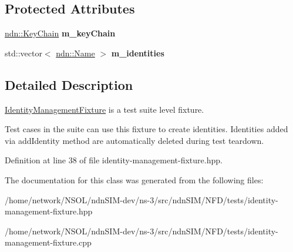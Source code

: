 \subsection*{Protected Attributes}
\begin{DoxyCompactItemize}
\item 
\hyperlink{classndn_1_1security_1_1KeyChain}{ndn\+::\+Key\+Chain} {\bfseries m\+\_\+key\+Chain}\hypertarget{classnfd_1_1tests_1_1IdentityManagementFixture_a8ad16f44006bc94a124d6c5d1dda46db}{}\label{classnfd_1_1tests_1_1IdentityManagementFixture_a8ad16f44006bc94a124d6c5d1dda46db}

\item 
std\+::vector$<$ \hyperlink{classndn_1_1Name}{ndn\+::\+Name} $>$ {\bfseries m\+\_\+identities}\hypertarget{classnfd_1_1tests_1_1IdentityManagementFixture_a1350beb5bb6d22bb8b19ffc294bfa92b}{}\label{classnfd_1_1tests_1_1IdentityManagementFixture_a1350beb5bb6d22bb8b19ffc294bfa92b}

\end{DoxyCompactItemize}


\subsection{Detailed Description}
\hyperlink{classnfd_1_1tests_1_1IdentityManagementFixture}{Identity\+Management\+Fixture} is a test suite level fixture. 

Test cases in the suite can use this fixture to create identities. Identities added via add\+Identity method are automatically deleted during test teardown. 

Definition at line 38 of file identity-\/management-\/fixture.\+hpp.



The documentation for this class was generated from the following files\+:\begin{DoxyCompactItemize}
\item 
/home/network/\+N\+S\+O\+L/ndn\+S\+I\+M-\/dev/ns-\/3/src/ndn\+S\+I\+M/\+N\+F\+D/tests/identity-\/management-\/fixture.\+hpp\item 
/home/network/\+N\+S\+O\+L/ndn\+S\+I\+M-\/dev/ns-\/3/src/ndn\+S\+I\+M/\+N\+F\+D/tests/identity-\/management-\/fixture.\+cpp\end{DoxyCompactItemize}
